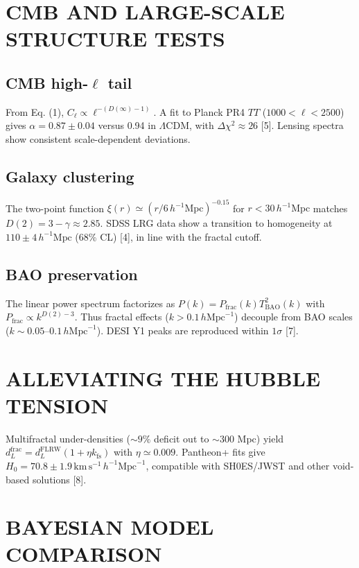 \documentclass[10pt,twocolumn]{article}
\begin{document}
\section{CMB AND LARGE-SCALE STRUCTURE TESTS}

\subsection{CMB high-$\ell$ tail}

From Eq. (1), $C_\ell\propto\ell^{-(D(\infty)-1)}$. A fit to Planck PR4 $TT$ ($1000<\ell<2500$) gives $\alpha=0.87\pm0.04$ versus 0.94 in $\Lambda$CDM, with $\Delta\chi^2\approx26$ [5]. Lensing spectra show consistent scale-dependent deviations.

\subsection{Galaxy clustering}

The two-point function $\xi(r)\simeq(r/6\,h^{-1}\mathrm{Mpc})^{-0.15}$ for $r<30\,h^{-1}\mathrm{Mpc}$ matches $D(2)=3-\gamma\approx2.85$. SDSS LRG data show a transition to homogeneity at $110\pm4\,h^{-1}\mathrm{Mpc}$ (68\% CL) [4], in line with the fractal cutoff.

\subsection{BAO preservation}

The linear power spectrum factorizes as $P(k)=P_{\mathrm{frac}}(k)T^2_{\mathrm{BAO}}(k)$ with $P_{\mathrm{frac}}\propto k^{D(2)-3}$. Thus fractal effects ($k>0.1\,h\mathrm{Mpc}^{-1}$) decouple from BAO scales ($k\sim0.05$--$0.1\,h\mathrm{Mpc}^{-1}$). DESI Y1 peaks are reproduced within $1\sigma$ [7].

\section{ALLEVIATING THE HUBBLE TENSION}

Multifractal under-densities ($\sim9\%$ deficit out to $\sim300$ Mpc) yield $d^{\mathrm{frac}}_L=d^{\mathrm{FLRW}}_L(1+\eta k_{\mathrm{fs}})$ with $\eta\simeq0.009$. Pantheon+ fits give $H_0=70.8\pm1.9\,\mathrm{km}\,\mathrm{s}^{-1}\,h^{-1}\mathrm{Mpc}^{-1}$, compatible with SH0ES/JWST and other void-based solutions [8].

\section{BAYESIAN MODEL COMPARISON}
\end{document}
